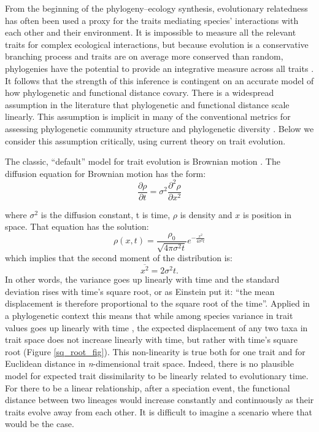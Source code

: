 From the beginning of the phylogeny--ecology synthesis, evolutionary 
relatedness has often been used a proxy for the traits mediating species' 
interactions with each other and their environment. It is impossible to 
measure all the relevant traits for complex ecological interactions, but 
because evolution is a conservative branching process and traits are on 
average more conserved than random, phylogenies have the potential to provide 
an integrative measure across all traits \citep{Webb2000}. It follows that the 
strength of this inference is contingent on an accurate model of how 
phylogenetic and functional distance covary. There is a widespread assumption in the literature \citep[see Figure 1b of][] 
{cadotte2013} that phylogenetic and functional distance scale linearly.  This assumption is 
implicit in many of the conventional metrics for assessing phylogenetic community structure and 
phylogenetic diversity \citep{vellend2010}. Below we consider this assumption 
critically, using current theory on trait evolution.  

The classic, ``default'' model for trait evolution is Brownian motion 
\citep[Figure \ref{sq_root_fig}b and][]{Felsenstein1985}.
The diffusion equation for Brownian motion \citep{Einstein1905} has the form:
\begin{equation} 
\frac{\partial\rho}{\partial t}=\sigma^2\frac{\partial^2\rho}{\partial x^2}
\end{equation} 

where $\sigma^2$ is the diffusion constant, t is time, $\rho$ is density and $x$ is position in space. That equation has the solution:
\begin{equation} 
\rho(x,t)=\frac{\rho_0}{\sqrt{4\pi \sigma^2t}}e^{-\frac{x^2}{4\sigma^2t}}
\end{equation} 
which implies that the second moment of the distribution is:
\begin{equation} 
\overline{x^2}=2\sigma^2t.
\end{equation} 
In other words, the variance goes up linearly with time and the standard deviation rises with time's square root, or as 
Einstein put it: ``the mean displacement is therefore proportional to the square root of the time''. Applied in a phylogenetic context 
this means that while among species variance in trait values goes up linearly 
with time \citep{Felsenstein1985}, the expected displacement of any two taxa in trait space
does not increase linearly with time, but rather with time's square root (Figure \ref{sq_root_fig}). This non-linearity is true both for one trait
and for Euclidean distance in \textit{n}-dimensional trait space. Indeed, there is no plausible 
model for expected trait dissimilarity to be linearly related to evolutionary 
time. For there to be a linear relationship, after a speciation event, the functional distance between two lineages would increase constantly and continuously as their traits evolve away from each other. It is difficult to imagine a scenario where that would be the case.

